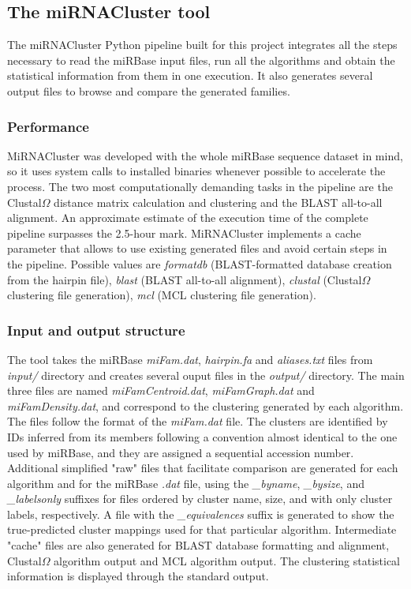 \documentclass[nocrop]{bioinfo}
\begin{document}
\subsection{The miRNACluster tool}
The miRNACluster Python pipeline built for this project integrates all the steps necessary to read the miRBase input files, run all the algorithms and obtain the statistical information from them in one execution. It also generates several output files to browse and compare the generated families.

\subsubsection{Performance}
MiRNACluster was developed with the whole miRBase sequence dataset in mind, so it uses system calls to installed binaries whenever possible to accelerate the process. The two most computationally demanding tasks in the pipeline are the Clustal$\Omega$ distance matrix calculation and clustering and the BLAST all-to-all alignment. An approximate estimate of the execution time of the complete pipeline surpasses the 2.5-hour mark. MiRNACluster implements a cache parameter that allows to use existing generated files and avoid certain steps in the pipeline. Possible values are \textit{formatdb} (BLAST-formatted database creation from the hairpin file), \textit{blast} (BLAST all-to-all alignment), \textit{clustal} (Clustal$\Omega$ clustering file generation), \textit{mcl} (MCL clustering file generation). 

\subsubsection{Input and output structure}
The tool takes the miRBase \textit{miFam.dat}, \textit{hairpin.fa} and \textit{aliases.txt} files from \textit{input/} directory and creates several ouput files in the \textit{output/} directory. The main three files are named \textit{miFamCentroid.dat}, \textit{miFamGraph.dat} and \textit{miFamDensity.dat}, and correspond to the clustering generated by each algorithm. The files follow the format of the \textit{miFam.dat} file. The clusters are identified by IDs inferred from its members following a convention almost identical to the one used by miRBase, and they are assigned a sequential accession number. Additional simplified "raw" files that facilitate comparison are generated for each algorithm and for the miRBase \textit{.dat} file, using the \textit{\_byname}, \textit{\_bysize}, and \textit{\_labelsonly} suffixes for files ordered by cluster name, size, and with only cluster labels, respectively. A file with the \textit{\_equivalences} suffix is generated to show the true-predicted cluster mappings used for that particular algorithm. Intermediate "cache" files are also generated for BLAST database formatting and alignment, Clustal$\Omega$ algorithm output and MCL algorithm output. The clustering statistical information is displayed through the standard output.
\end{document}

